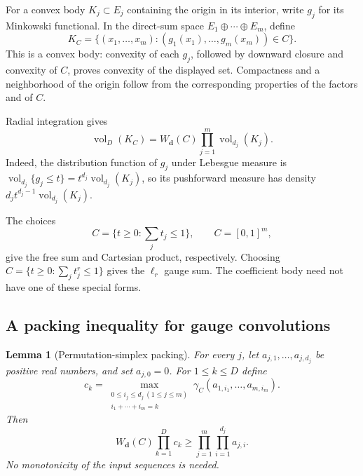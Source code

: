 \documentclass[11pt,a4paper]{article}
\newtheorem{lemma}[theorem]{Lemma}
\theoremstyle{remark}\newtheorem{remark}[theorem]{Remark}
\begin{document}
For a convex body $K_j\subset E_j$ containing the origin in its
interior, write $g_j$ for its Minkowski functional.  In the direct-sum
space $E_1\oplus\cdots\oplus E_m$, define
\begin{equation}\label{c6f:eq:aggregation}
 K_C=\{(x_1,\ldots,x_m):(g_1(x_1),\ldots,g_m(x_m))\in C\}.
\end{equation}
This is a convex body: convexity of each $g_j$, followed by downward
closure and convexity of $C$, proves convexity of the displayed set.
Compactness and a neighborhood of the origin follow from the
corresponding properties of the factors and of $C$.

Radial integration gives
\begin{equation}\label{c6f:eq:body-volume}
 \operatorname{vol}_D(K_C)
 =W_{\boldsymbol d}(C)\prod_{j=1}^m\operatorname{vol}_{d_j}(K_j).
\end{equation}
Indeed, the distribution function of $g_j$ under Lebesgue measure is
$\operatorname{vol}_{d_j}\{g_j\le t\}
=t^{d_j}\operatorname{vol}_{d_j}(K_j)$, so its pushforward measure
has density $d_jt^{d_j-1}\operatorname{vol}_{d_j}(K_j)$.

The choices
\[
 C=\{t\ge0:\textstyle\sum_jt_j\le1\},\qquad
 C=[0,1]^m,
\]
give the free sum and Cartesian product, respectively.  Choosing
$C=\{t\ge0:\sum_jt_j^r\le1\}$ gives the $\ell_r$ gauge sum.
The coefficient body need not have one of these special forms.

\subsection{A packing inequality for gauge convolutions}

\begin{lemma}[Permutation-simplex packing]\label{c6f:lem:packing}
For every $j$, let $a_{j,1},\ldots,a_{j,d_j}$ be positive real
numbers, and set $a_{j,0}=0$.  For $1\le k\le D$ define
\begin{equation}\label{c6f:eq:convolution}
 c_k=\max_{\substack{0\le i_j\le d_j\ (1\le j\le m)\\
                     i_1+\cdots+i_m=k}}
         \gamma_C(a_{1,i_1},\ldots,a_{m,i_m}).
\end{equation}
Then
\begin{equation}\label{c6f:eq:packing-bound}
 W_{\boldsymbol d}(C)\prod_{k=1}^D c_k
   \ge\prod_{j=1}^m\prod_{i=1}^{d_j}a_{j,i}.
\end{equation}
No monotonicity of the input sequences is needed.
\end{lemma}
\end{document}
